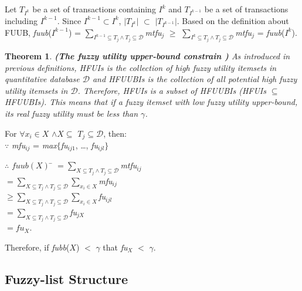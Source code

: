 \documentclass[journal]{IEEEtran}
\newenvironment{proof}{{\noindent\it\bf Proof}\quad}{\par}
\newtheorem{theorem}{Theorem}   %
\begin{document}
\begin{proof}
	Let $T_{I^k}$ be a set of transactions containing $I^k$ and $T_{I^{k-1}}$ be a set of transactions including $I^{k-1}$. Since $I^{k-1} \subset I^{k}$, $\mid$$T_{I^k}$$\mid$ $\subset$ $\mid$$T_{I^{k-1}}$$\mid$. Based on the definition about FUUB, \textit{fuub}($I^{k-1}$) = $\sum_{I^{k-1} \subseteq T_j \land T_j \subseteq \mathcal{D}}$\textit{mtfu}$_j$ $\ge$ $\sum_{I^k \subseteq T_j \land T_j \subseteq \mathcal{D}}$\textit{mtfu}$_j$ = \textit{fuub}($I^k$).
\end{proof}

\begin{theorem}
	\textbf{(The fuzzy utility upper-bound constrain \cite{lan2015fuzzy})}
	\label{theo:upperbound}
	\rm As introduced in previous definitions, HFUIs is the collection of high fuzzy utility itemsets in quantitative database $\mathcal{D}$ and HFUUBIs is the collection of all potential high fuzzy utility itemsets in $\mathcal{D}$. Therefore, HFUIs is a subset of HFUUBIs (HFUIs $\subseteq$ HFUUBIs). This means that if a fuzzy itemset with low fuzzy utility upper-bound, its real fuzzy utility must be less than $\gamma$.
\end{theorem}

\begin{proof}
	For $\forall x_i \in X$ $\land X \subseteq $ $T_j \subseteq \mathcal{D}$, then: \\
	$\because$ \textit{mfu}$_{ij}$ = \textit{max}$\{$\textit{fu}$_{ij1}$, \ldots, \textit{fu}$_{ijl}$$\}$
	\begin{tabbing}
		$\therefore$ $fuub(X)$ \= $=\sum_{X \subseteq T_j \land T_j \subseteq \mathcal{D}}$\textit{mtfu}$_{ij}$ \\
		\>$=\sum_{X \subseteq T_j \land T_j \subseteq \mathcal{D}}$$\sum_{x_i \in X}$\textit{mfu}$_{ij}$ \\
		\>$\ge\sum_{X \subseteq T_j \land T_j \subseteq \mathcal{D}}$$\sum_{x_i \in X}$\textit{fu}$_{ijl}$ \\
		\>$=\sum_{X \subseteq T_j \land T_j \subseteq \mathcal{D}}$\textit{fu}$_{jX}$ \\
		\>$=fu_{X}$.
	\end{tabbing}
	Therefore, if \textit{fubb}($X$) $<$ $\gamma$ that \textit{fu}$_{X}$ $<$ $\gamma$.
\end{proof}


\subsection{Fuzzy-list Structure}
\end{document}
